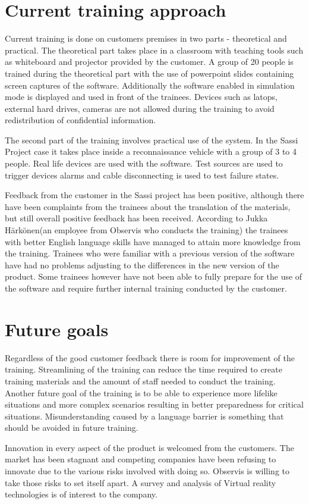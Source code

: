 \documentclass[12pt, a4paper,oneside, nocenter]{thesis}
\begin{document}
\section{Current training approach}
Current training is done on customers premises in two parts - theoretical and practical. The theoretical part takes place in a classroom with teaching tools such as whiteboard and projector provided by the customer. A group of 20 people is trained during the theoretical part with the use of powerpoint slides containing screen captures of the software. Additionally the software enabled in simulation mode is displayed and used in front of the trainees. Devices such as latops, external hard drives, cameras are not allowed during the training to avoid redistribution of confidential information.
\par
The second part of the training involves practical use of the system. In the Sassi Project case it takes place inside a reconnaissance vehicle with a group of 3 to 4 people. Real life devices are used with the software. Test sources are used to trigger devices alarms and cable disconnecting is used to test failure states.
\par%
Feedback from the customer in the Sassi project has been positive, although there have been complaints from the trainees about the translation of the materials, but still overall positive feedback has been received. According to Jukka Härkönen(an employee from Observis who conducts the training) the trainees with better English language skills have managed to attain more knowledge from the training. Trainees who were familiar with a previous version of the software have had no problems adjusting to the differences in the new version of the product. Some trainees however have not been able to fully prepare for the use of the software and require further internal training conducted by the customer.
\section{Future goals}
Regardless of the good customer feedback there is room for improvement of the training. Streamlining of the training can reduce the time required to create training materials and the amount of staff needed to conduct the training. Another future goal of the training is to be able to experience more lifelike situations and more complex scenarios resulting in better preparedness for critical situations. Misunderstanding caused by a language barrier is something that should be avoided in future training.
\par
Innovation in every aspect of the product is welcomed from the customers. The market has been stagnant and competing companies have been refusing to innovate due to the various risks involved with doing so. Observis is willing to take those risks to set itself apart. A survey and analysis of Virtual reality technologies is of interest to the company.
\par
\end{document}
